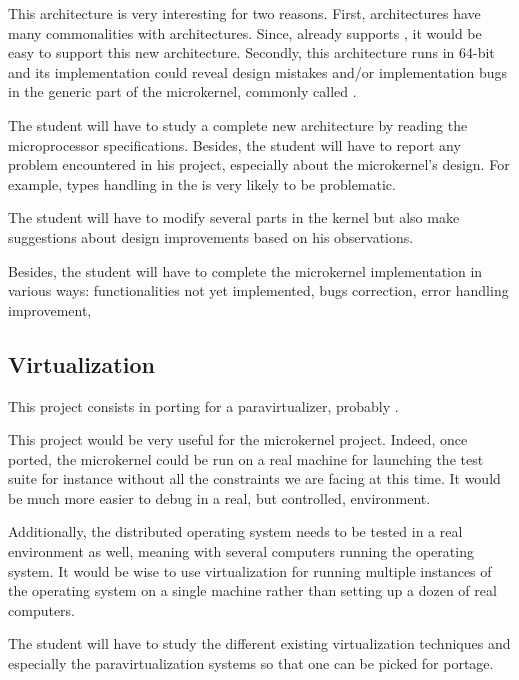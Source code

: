 \begin{multicols}{2}
This architecture is very interesting for two reasons. First, 
architectures have many commonalities with  architectures. Since,
 already supports , it would be easy to support this new
architecture. Secondly, this architecture runs in 64-bit and its implementation
could reveal design mistakes and/or implementation bugs in the generic
part of the microkernel, commonly called .

The student will have to study a complete new architecture by reading the
microprocessor specifications. Besides, the student will have to report
any problem encountered in his project, especially about the microkernel's
design. For example, types handling in the  is very likely to
be problematic.

The student will have to modify several parts in the kernel but also
make suggestions about design improvements based on his observations.

Besides, the student will have to complete the microkernel implementation
in various ways: functionalities not yet implemented, bugs correction, error
handling improvement, \etc{}

%
%

\subsection{Virtualization}

This project consists in porting  for a paravirtualizer, probably
.

This project would be very useful for the  microkernel project. Indeed,
once ported, the  microkernel could be run on a real machine for
launching the test suite for instance without all the constraints we are
facing at this time. It would be much more easier to debug in a real, but
controlled, environment.

Additionally, the  distributed operating system needs to be tested in
a real environment as well, meaning with several computers running the 
operating system. It would be wise to use virtualization for running multiple
instances of the  operating system on a single machine rather than
setting up a dozen of real computers.

The student will have to study the different existing virtualization techniques
and especially the paravirtualization systems so that one can be picked
for portage.

\end{multicols}



